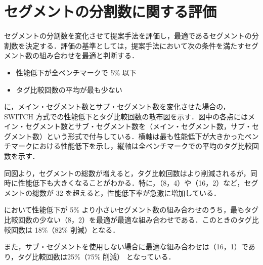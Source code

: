 \section{セグメントの分割数に関する評価}
\label{sec:eval_ipc_comp}
セグメントの分割数を変化させて提案手法を評価し，最適であるセグメントの分割数を決定する．評価の基準としては，提案手法において次の条件を満たすセグメント数の組み合わせを最適と判断する．
\begin{itemize}
  \item 性能低下が全ベンチマークで 5\% 以下
  \item タグ比較回数の平均が最も少ない
\end{itemize}

に，メイン・セグメント数とサブ・セグメント数を変化させた場合の，SWITCH 方式での性能低下とタグ比較回数の散布図を示す．図中の各点にはメイン・セグメント数とサブ・セグメント数を（メイン・セグメント数，サブ・セグメント数）という形式で付与している．横軸は最も性能低下が大きかったベンチマークにおける性能低下を示し，縦軸は全ベンチマークでの平均のタグ比較回数を示す．

同図より，セグメントの総数が増えると，タグ比較回数はより削減されるが，同時に性能低下も大きくなることがわかる．特に，（8，4）や（16，2）など，セグメントの総数が 32 を超えると，性能低下率が急激に増加している．

において性能低下が 5\% より小さいセグメント数の組み合わせのうち，最もタグ比較回数の少ない（8，2）を最適が最適な組み合わせである．このときのタグ比較回数は 18\%（82\% 削減）となる．

また，サブ・セグメントを使用しない場合に最適な組み合わせは（16，1）であり，タグ比較回数は25\%（75\% 削減） となっている．

